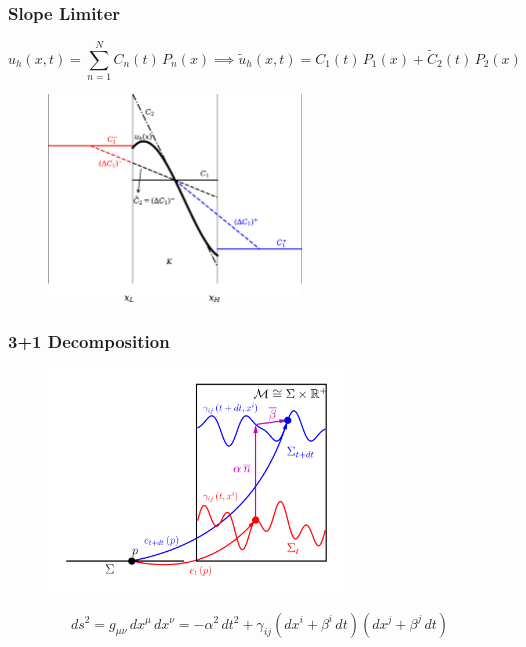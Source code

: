 \documentclass{beamer}
\begin{document}
\begin{frame}
\frametitle{Slope Limiter}

  \Fontvi
  \begin{equation*}
  u_{h}\left(x,t\right)
  =\sum\limits_{n=1}^{N}
  C_{n}\left(t\right)\,P_{n}\left(x\right)\implies
  \tilde{u}_{h}\left(x,t\right)
  =C_{1}\left(t\right)\,P_{1}\left(x\right)
  +\tilde{C}_{2}\left(t\right)\,P_{2}\left(x\right)
  \end{equation*}

  \begin{figure}[htb!]
    \centering
    \includegraphics[width=0.6\textwidth]{fig.MinMod.jpeg}
  \end{figure}

\end{frame}

\begin{frame}
\frametitle{3+1 Decomposition}

  \begin{figure}[htb!]
    \centering
    \includegraphics[width=0.7\textwidth]{fig.1p1.png}
  \end{figure}

  \vspace{-2em}

  \begin{equation*}
    ds^{2}
    =g_{\mu\nu}\,dx^{\mu}\,dx^{\nu}
    =-\alpha^{2}\,dt^{2}
     +\gamma_{ij}\left(dx^{i}+\beta^{i}\,dt\right)
                 \left(dx^{j}+\beta^{j}\,dt\right)
  \end{equation*}

\end{frame}
\end{document}

